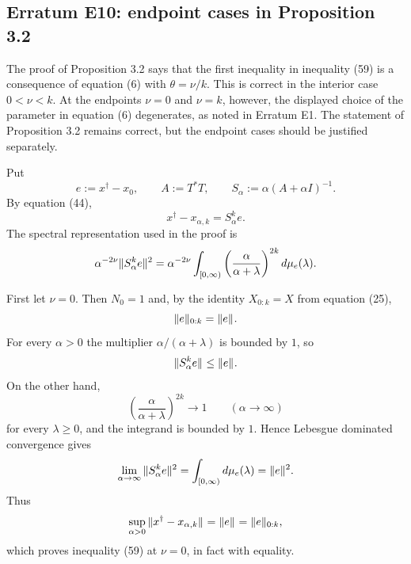 
\subsection*{Erratum E10: endpoint cases in Proposition 3.2}
\label{s:erratum:E10}

The proof of Proposition 3.2 says that the first inequality in
inequality (59) is a consequence of equation (6) with
$\theta=\nu/k$.  This is correct in the interior case $0<\nu<k$.  At the
endpoints $\nu=0$ and $\nu=k$, however, the displayed choice of the
parameter in equation (6) degenerates, as noted in Erratum E1.  The
statement of Proposition 3.2 remains correct, but the endpoint
cases should be justified separately.

Put
\[
        e:=x^\dag-x_0,
        \qquad
        A:=T^*T,
        \qquad
        S_\alpha:=\alpha(A+\alpha I)^{-1} .
\]
By equation (44),
\[
        x^\dag-x_{\alpha,k}=S_\alpha^k e .
\]
The spectral representation used in the proof is
\begin{align}
\label{e:erratum:E10:spectral}
        \alpha^{-2\nu}\| S_\alpha^k e \|_{  }^2
        =
        \alpha^{-2\nu}
        \int_{[0,\infty)}
        \left(\frac{\alpha}{\alpha+\lambda}\right)^{2k}
        d\mu_e(\lambda).
\end{align}

First let $\nu=0$.  Then $N_0=1$ and, by the identity $X_{0:k}=X$ from
equation (25),
\[
        \| e \|_{ 0:k }=\| e \|_{  } .
\]
For every $\alpha>0$ the multiplier
$\alpha/(\alpha+\lambda)$ is bounded by $1$, so
\[
        \| S_\alpha^k e \|_{  } \leq \| e \|_{  } .
\]
On the other hand,
\[
        \left(\frac{\alpha}{\alpha+\lambda}\right)^{2k}
        \longrightarrow 1
        \qquad (\alpha\to\infty)
\]
for every $\lambda\geq0$, and the integrand is bounded by $1$.  Hence
Lebesgue dominated convergence gives
\[
        \lim_{\alpha\to\infty}\| S_\alpha^k e \|_{  }^2
        =
        \int_{[0,\infty)} d\mu_e(\lambda)
        =
        \| e \|_{  }^2 .
\]
Thus
\[
        \sup_{\alpha>0}\| x^\dag-x_{\alpha,k} \|_{  }
        =
        \| e \|_{  }
        =
        \| e \|_{ 0:k },
\]
which proves inequality (59) at $\nu=0$, in fact with equality.

